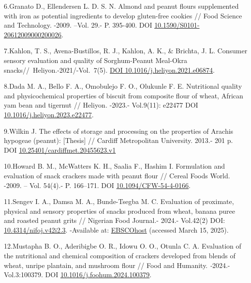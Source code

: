 {{{6.Granato D., Ellendersen L. D. S. N. Almond and peanut flours
supplemented with iron as potential ingredients to develop gluten-free
cookies // Food Science and Technology. -2009. --Vol. 29.- P. 395-400.
DOI
\href{https://doi.org/10.1590/S0101-20612009000200026}{10.1590/S0101-20612009000200026}.

7.Kahlon, T. S., Avena-Bustillos, R. J., Kahlon, A. K., \& Brichta, J.
L. Consumer sensory evaluation and quality of Sorghum-Peanut Meal-Okra
snacks//~Heliyon.-2021/-Vol.~7(5).
\href{https://doi.org/10.1016/j.heliyon.2021.e06874}{DOI
10.1016/j.heliyon.2021.e06874}.

8.Dada M. A., Bello F. A., Omobulejo F. O., Olukunle F. E. Nutritional
quality and physicochemical properties of biscuit from composite flour
of wheat, African yam bean and tigernut // Heliyon\emph{.} -2023.-
Vol.9(11): e22477 DOI
\href{https://doi.org/10.1016/j.heliyon.2023.e22477}{10.1016/j.heliyon.2023.e22477}.

9.Wilkin J. The effects of storage and processing on the properties of
Arachis hypogeae (peanut): {[}Thesis{]} // Cardiff Metropolitan
University. 2013.- 201 p. DOI
\href{https://doi.org/10.25401/cardiffmet.20455623.v1}{10.25401/cardiffmet.20455623.v1}

10.Howard B. M., McWatters K. H., Saalia F., Hashim I. Formulation and
evaluation of snack crackers made with peanut flour // Cereal Foods
World. -2009. -- Vol. 54(4).- P. 166--171. DOI
\href{https://doi.org/10.1094/CFW-54-4-0166}{10.1094/CFW-54-4-0166}.

11.Sengev I. A., Damsa M. A., Bunde-Tsegba M. C. Evaluation of
proximate, physical and sensory properties of snacks produced from
wheat, banana puree and roasted peanut grits // Nigerian Food Journal.-
2024.- Vol.42(2) DOI:
\href{https://openurl.ebsco.com/EPDB\%3Agcd\%3A9\%3A2629225/detailv2?sid=ebsco\%3Aplink\%3Ascholar&id=ebsco\%3Agcd\%3A182511032&crl=c&link_origin=none}{10.4314/nifoj.v42i2.3}.
-Available at:
\href{https://openurl.ebsco.com/EPDB\%3Agcd\%3A9\%3A2629225/detailv2?sid=ebsco\%3Aplink\%3Ascholar&id=ebsco\%3Agcd\%3A182511032&crl=c&link_origin=none}{EBSCOhost}
(accessed March 15, 2025).

12.Mustapha B. O., Aderibigbe O. R., Idowu O. O., Otunla C. A.
Evaluation of the nutritional and chemical composition of crackers
developed from blends of wheat, unripe plantain, and mushroom flour //
Food and Humanity. \emph{-}2024.-Vol.3:100379. DOI
\href{https://doi.org/10.1016/j.foohum.2024.100379}{10.1016/j.foohum.2024.100379}.

}}}
